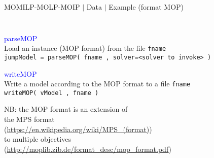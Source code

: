 \documentclass[10pt,xcolor=dvipsnames]{beamer}
\newcommand{\red}{\textcolor{red}}
\newcommand{\blue}{\textcolor{blue}}
\begin{document}
%
% 
\begin{frame}[fragile=singleslide]{MOMILP-MOLP-MOIP $\mid$ Data $\mid$ Example (format MOP)}

\begin{columns}
\begin{column}{0.3\textwidth}
{\small
}
\end{column}
\begin{column}{0.3\textwidth}
\end{column}
\begin{column}{0.15\textwidth}
\end{column}
\end{columns}

\vspace{5mm}
\blue{parseMOP}\\
          Load an instance (MOP format) from the file \texttt{fname}    \\
           \texttt{jumpModel  = \texttt{{parseMOP}( fname , solver=<solver to invoke> ) }} 
           \medskip

\blue{writeMOP}\\
  Write a model according to the MOP format to a file \texttt{fname} \\
           \texttt{{writeMOP}( vModel , fname )}  

\vspace{5mm}
NB: the MOP format is an extension of \\
\smallskip
\quad the MPS format\\ \qquad (\url{https://en.wikipedia.org/wiki/MPS_(format)})\\
\smallskip
\quad  to multiple objectives\\ \qquad (\url{http://moplib.zib.de/format_desc/mop_format.pdf})
\end{frame}
\end{document}
